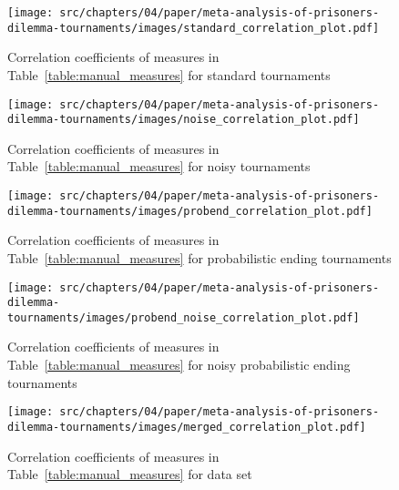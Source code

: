 \begin{figure}[!htbp]
        \begin{center}
            \texttt{[image: src/chapters/04/paper/meta-analysis-of-prisoners-dilemma-tournaments/images/standard\_correlation\_plot.pdf]}
        \end{center}
        \caption{Correlation coefficients of measures in Table~\ref{table:manual_measures}
        for standard tournaments}
\end{figure}
\begin{figure}[!htbp]
    \begin{center}
        \texttt{[image: src/chapters/04/paper/meta-analysis-of-prisoners-dilemma-tournaments/images/noise\_correlation\_plot.pdf]}
    \end{center}
    \caption{Correlation coefficients of measures in Table~\ref{table:manual_measures}
    for noisy tournaments}
\end{figure}
\begin{figure}[!htbp]
    \begin{center}
        \texttt{[image: src/chapters/04/paper/meta-analysis-of-prisoners-dilemma-tournaments/images/probend\_correlation\_plot.pdf]}
    \end{center}
    \caption{Correlation coefficients of measures in Table~\ref{table:manual_measures}
    for probabilistic ending tournaments}
\end{figure}
\begin{figure}[!htbp]
    \begin{center}
        \texttt{[image: src/chapters/04/paper/meta-analysis-of-prisoners-dilemma-tournaments/images/probend\_noise\_correlation\_plot.pdf]}
    \end{center}
    \caption{Correlation coefficients of measures in Table~\ref{table:manual_measures}
    for noisy probabilistic ending tournaments}
\end{figure}
\begin{figure}[!htbp]
    \begin{center}
        \texttt{[image: src/chapters/04/paper/meta-analysis-of-prisoners-dilemma-tournaments/images/merged\_correlation\_plot.pdf]}
    \end{center}
    \caption{Correlation coefficients of measures in Table~\ref{table:manual_measures}
    for data set}
\end{figure}
